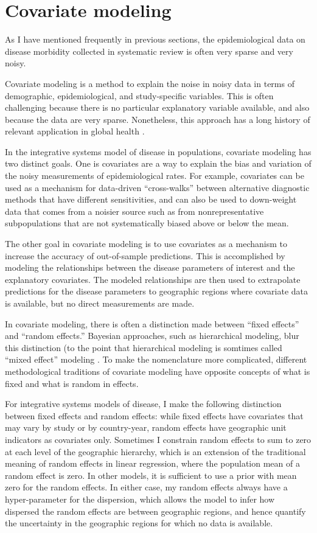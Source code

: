\chapter{Covariate modeling}
\label{theory-covariate_modeling}
As I have mentioned frequently in previous sections, the
epidemiological data on disease morbidity collected in systematic
review is often very sparse and very noisy.

Covariate modeling is a method to explain the noise in noisy
data in terms of demographic, epidemiological, and study-specific
variables.  This is often challenging because there is no particular
explanatory variable available, and also because the data are very
sparse.  Nonetheless, this approach has a long history of relevant
application in global health \cite{Girosi_Demographic_2008,Wakefield_Bayesian_1996}.

In the integrative systems model of disease in populations, covariate
modeling has two distinct goals.  One is covariates are a way to
explain the bias and variation of the noisy measurements of
epidemiological rates.  For example, covariates can be used as a mechanism
for data-driven ``cross-walks'' between alternative diagnostic methods
that have different sensitivities, and can also be used to 
down-weight data that comes from a noisier source such as
from nonrepresentative subpopulations that are not systematically
biased above or below the mean.

The other goal in covariate modeling is to use covariates as a
mechanism to increase the accuracy of out-of-sample predictions.  This
is accomplished by modeling the relationships between the disease
parameters of interest and the explanatory covariates. The modeled
relationships are then used to extrapolate predictions for the disease
parameters to geographic regions where covariate data is available,
but no direct measurements are made.

In covariate modeling, there is often a distinction made between
``fixed effects'' and ``random effects.''  Bayesian approaches, such
as hierarchical modeling, blur this distinction (to the point that
hierarchical modeling is somtimes called ``mixed effect'' modeling
\cite{Gelman_Multilevel_2005}.  To make the nomenclature more
complicated, different methodological traditions of covariate modeling
have opposite concepts of what is fixed and what is random in effects.

For integrative systems models of disease, I make the following
distinction between fixed effects and random effects: while fixed
effects have covariates that may vary by study or by country-year,
random effects have geographic unit indicators as covariates only.
Sometimes I constrain random effects to sum to zero at each level of
the geographic hierarchy, which is an extension of the traditional
meaning of random effects in linear regression, where the population
mean of a random effect is zero.  In other models, it is sufficient to
use a prior with mean zero for the random effects.  In either case,
my random effects always have a hyper-parameter for the dispersion,
which allows the model to infer how dispersed the random effects are
between geographic regions, and hence quantify the uncertainty in the
geographic regions for which no data is available.

